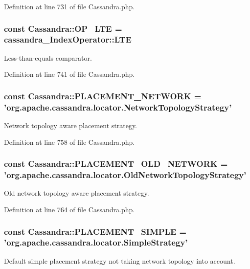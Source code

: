 Definition at line 731 of file Cassandra.php.

\hypertarget{classCassandra_ab633158313b4f7f785910884d950f945}{
\subsubsection[{OP\_\-LTE}]{\setlength{\rightskip}{0pt plus 5cm}const {\bf Cassandra::OP\_\-LTE} = cassandra\_\-IndexOperator::LTE}}
\label{classCassandra_ab633158313b4f7f785910884d950f945}
Less-\/than-\/equals comparator. 

Definition at line 741 of file Cassandra.php.

\hypertarget{classCassandra_a82e1fae7c469b0983ad1d38b309273fd}{
\subsubsection[{PLACEMENT\_\-NETWORK}]{\setlength{\rightskip}{0pt plus 5cm}const {\bf Cassandra::PLACEMENT\_\-NETWORK} = 'org.apache.cassandra.locator.NetworkTopologyStrategy'}}
\label{classCassandra_a82e1fae7c469b0983ad1d38b309273fd}
Network topology aware placement strategy. 

Definition at line 758 of file Cassandra.php.

\hypertarget{classCassandra_a3ea159c9a7ead7fa56cac7f8ebe9bc74}{
\subsubsection[{PLACEMENT\_\-OLD\_\-NETWORK}]{\setlength{\rightskip}{0pt plus 5cm}const {\bf Cassandra::PLACEMENT\_\-OLD\_\-NETWORK} = 'org.apache.cassandra.locator.OldNetworkTopologyStrategy'}}
\label{classCassandra_a3ea159c9a7ead7fa56cac7f8ebe9bc74}
Old network topology aware placement strategy. 

Definition at line 764 of file Cassandra.php.

\hypertarget{classCassandra_acae99f4717a1b6a2fb14343b9ca02806}{
\subsubsection[{PLACEMENT\_\-SIMPLE}]{\setlength{\rightskip}{0pt plus 5cm}const {\bf Cassandra::PLACEMENT\_\-SIMPLE} = 'org.apache.cassandra.locator.SimpleStrategy'}}
\label{classCassandra_acae99f4717a1b6a2fb14343b9ca02806}
Default simple placement strategy not taking network topology into account. 


